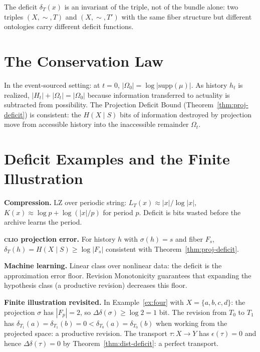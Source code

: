 \documentclass[12pt, a4paper]{article}
\theoremstyle{plain}
\theoremstyle{definition}
\theoremstyle{remark}
\newcommand{\Lreach}{L_T}
\newcommand{\CLIO}{\textsc{clio}}
\newcommand{\Ddelta}{\Delta\delta}
\newcommand{\eps}{\epsilon}
\begin{document}
The deficit $\delta_T(x)$ is an invariant of the triple, not of the bundle
alone: two triples $(X,\sim,T)$ and $(X,\sim,T')$ with the same fiber
structure but different ontologies carry different deficit functions.

\section{The Conservation Law}
\label{app:conservation}

In the event-sourced setting: at $t=0$, $|\Omega_0|=\log|\mathrm{supp}(\mu)|$.
As history $h_t$ is realized, $|H_t|+|\Omega_t|=|\Omega_0|$ because
information transferred to actuality is subtracted from possibility.
The Projection Deficit Bound (Theorem~\ref{thm:proj-deficit}) is consistent:
the $H(X\mid S)$ bits of information destroyed by projection move from
accessible history into the inaccessible remainder $\Omega_t$.

\section{Deficit Examples and the Finite Illustration}
\label{app:deficit}

\noindent\textbf{Compression.} LZ over periodic string: $\Lreach(x)\approx|x|/\log|x|$,
$K(x)\approx\log p+\log(|x|/p)$ for period $p$. Deficit is bits wasted before
the archive learns the period.

\noindent\textbf{\CLIO{} projection error.} For history $h$ with $\sigma(h)=s$
and fiber $F_s$, $\delta_T(h)=H(X\mid S)\ge\log|F_s|$ consistent with
Theorem~\ref{thm:proj-deficit}.

\noindent\textbf{Machine learning.} Linear class over nonlinear data: the
deficit is the approximation error floor. Revision Monotonicity guarantees
that expanding the hypothesis class (a productive revision) decreases this
floor.

\noindent\textbf{Finite illustration revisited.} In Example~\ref{ex:four}
with $X=\{a,b,c,d\}$: the projection $\sigma$ has $|F_p|=2$, so
$\Ddelta(\sigma)\ge\log 2=1$ bit. The revision from $T_0$ to $T_1$ has
$\delta_{T_1}(a)=\delta_{T_1}(b)=0<\delta_{T_0}(a)=\delta_{T_0}(b)$
when working from the projected space: a productive revision. The transport
$\tau:X\to Y$ has $\eps(\tau)=0$ and hence $\Ddelta(\tau)=0$ by
Theorem~\ref{thm:dist-deficit}: a perfect transport.
\end{document}
